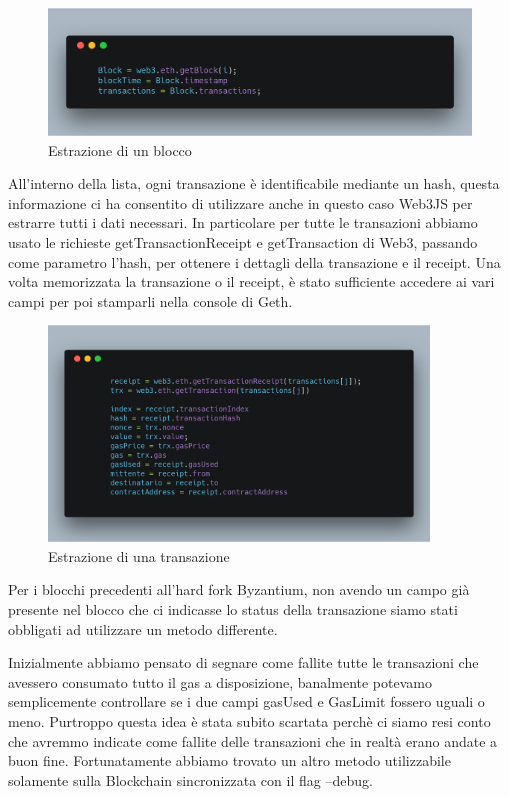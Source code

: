 \documentclass[12pt]{report}
\begin{document}
\begin{figure}[H]
    \includegraphics[width=\textwidth]{carbon-19}
    \caption{Estrazione di un blocco}
\end{figure}

All'interno della lista, ogni transazione è identificabile mediante un hash, questa informazione ci ha consentito di utilizzare anche in questo caso Web3JS per estrarre tutti i dati necessari.
In particolare per tutte le transazioni abbiamo usato le richieste getTransactionReceipt e getTransaction di Web3, passando come parametro l'hash, per ottenere i dettagli della transazione e il receipt.
Una volta memorizzata la transazione o il receipt, è stato sufficiente accedere ai vari campi per poi stamparli nella console di Geth.

\begin{figure}[H]
    \centering\includegraphics[width=0.9\textwidth]{carbon-20}
    \caption{Estrazione di una transazione}
\end{figure}

Per i blocchi precedenti all'hard fork Byzantium, non avendo un campo già presente nel blocco che ci indicasse lo status della transazione siamo stati obbligati ad utilizzare un metodo differente.

Inizialmente abbiamo pensato di segnare come fallite tutte le transazioni che avessero consumato tutto il gas a disposizione, banalmente potevamo semplicemente controllare se i due campi gasUsed e GasLimit fossero uguali o meno.
Purtroppo questa idea è stata subito scartata perchè ci siamo resi conto che avremmo indicate come fallite delle transazioni che in realtà erano andate a buon fine.
Fortunatamente abbiamo trovato un altro metodo utilizzabile solamente sulla Blockchain sincronizzata con il flag --debug.
\end{document}
